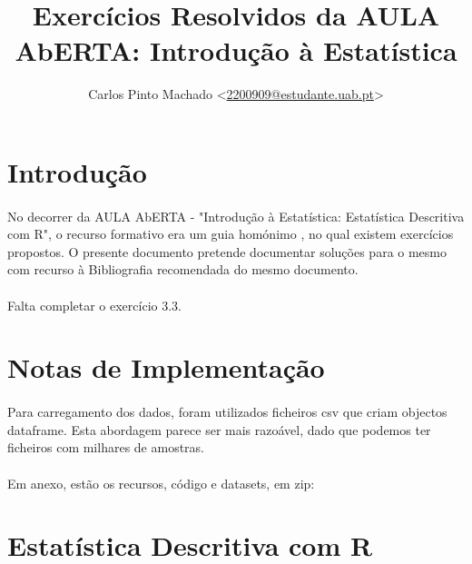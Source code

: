 \documentclass[11pt,a4paper]{article}
\author{Carlos Pinto Machado
	<\href{mailto:2200909@estudante.uab.pt}{2200909@estudante.uab.pt}>}
\title{Exercícios Resolvidos da AULA AbERTA: Introdução à Estatística}
\begin{document}
\maketitle
\tableofcontents

\clearpage

\section*{Introdução}

\paragraph{} No decorrer da AULA AbERTA - "Introdução à Estatística:
Estatística Descritiva com R"\cite{AulaAbertaIntroducaoEstatistica2017}, o
recurso formativo era um guia homónimo
\cite{OliveiraAulaAberta2017}, no qual existem
exercícios propostos. O presente documento pretende documentar soluções para o
mesmo com recurso à Bibliografia recomendada do mesmo
documento\cite{OliveiraEstatisticaDescritiva2011}.

\paragraph{} Falta completar o exercício 3.3.

\section*{Notas de Implementação}

\paragraph{} Para carregamento dos dados, foram utilizados ficheiros csv que
criam objectos dataframe. Esta abordagem parece ser mais razoável, dado que
podemos ter ficheiros com milhares de amostras.

\paragraph{} Em anexo, estão os recursos, código e datasets, em zip:

\clearpage

\setcounter{section}{2}
\section{Estatística Descritiva com R}
\end{document}
